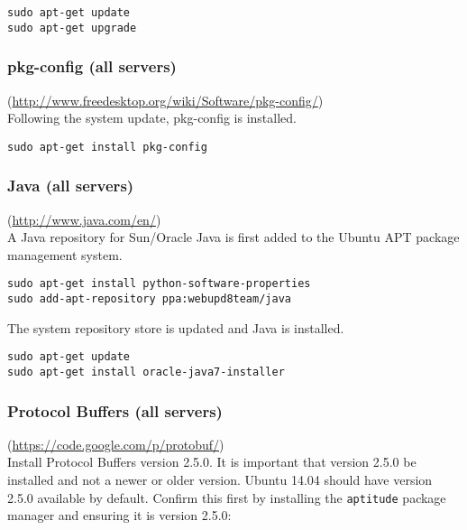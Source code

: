 \begin{verbatim}
sudo apt-get update
sudo apt-get upgrade
\end{verbatim}

\subsubsection{pkg-config (all servers)} (\url{http://www.freedesktop.org/wiki/Software/pkg-config/})\\
Following the system update, pkg-config is installed.
\begin{verbatim}
sudo apt-get install pkg-config
\end{verbatim}

\subsubsection{Java (all servers)} (\url{http://www.java.com/en/})\\
A Java repository for Sun/Oracle Java is first added to the Ubuntu APT package management system.
\begin{verbatim}
sudo apt-get install python-software-properties
sudo add-apt-repository ppa:webupd8team/java
\end{verbatim}
The system repository store is updated and Java is installed.
\begin{verbatim}
sudo apt-get update
sudo apt-get install oracle-java7-installer
\end{verbatim}


\subsubsection{Protocol Buffers (all servers)} (\url{https://code.google.com/p/protobuf/})\\
Install Protocol Buffers version 2.5.0.  It is important that version
2.5.0 be installed and not a newer or older version.  Ubuntu 14.04 should
have version 2.5.0 available by default.  Confirm this first by installing the
\verb|aptitude| package manager and ensuring it is version 2.5.0:

